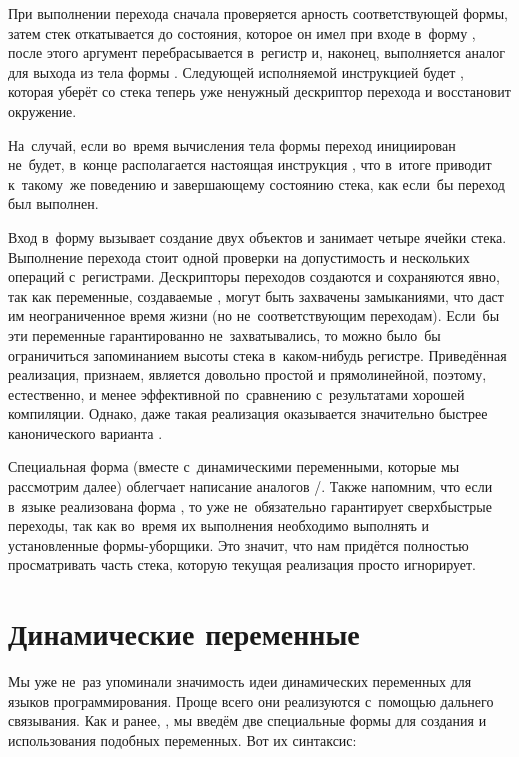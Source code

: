 При выполнении перехода сначала проверяется арность соответствующей формы,
затем стек откатывается до состояния, которое он имел при входе в~форму
, после этого аргумент перебрасывается в~регистр  и,
наконец, выполняется аналог  для выхода из тела формы .
Следующей исполняемой инструкцией будет , которая уберёт
со стека теперь уже ненужный дескриптор перехода и восстановит окружение.

На~случай, если во~время вычисления тела формы  переход
инициирован не~будет, в~конце располагается настоящая инструкция ,
что в~итоге приводит к~такому~же поведению и завершающему состоянию стека, как
если~бы переход был выполнен.

Вход в~форму  вызывает создание двух объектов и занимает четыре
ячейки стека. Выполнение перехода стоит одной проверки на допустимость и
нескольких операций с~регистрами. Дескрипторы переходов создаются и сохраняются
явно, так как переменные, создаваемые , могут быть захвачены
замыканиями, что даст им неограниченное время жизни (но не~соответствующим
переходам). Если~бы эти переменные гарантированно не~захватывались, то можно
было~бы ограничиться запоминанием высоты стека в~каком-нибудь регистре.
Приведённая реализация, признаем, является довольно простой и прямолинейной,
поэтому, естественно, и менее эффективной по~сравнению с~результатами хорошей
компиляции. Однако, даже такая реализация оказывается значительно быстрее
канонического варианта .

Специальная форма  (вместе с~динамическими переменными, которые
мы рассмотрим далее) облегчает написание аналогов \slash{}.
 Также напомним, что если в~языке
реализована форма , то  уже не~обязательно
гарантирует сверхбыстрые переходы, так как во~время их выполнения необходимо
выполнять и установленные  формы-уборщики. Это значит, что
нам придётся полностью просматривать часть стека, которую текущая реализация
просто игнорирует.


\section{Динамические переменные}\label{compilation/sect:dynamic}

Мы уже не~раз упоминали значимость идеи динамических переменных для языков
программирования. Проще всего они реализуются с~помощью дальнего связывания. Как
и ранее, , мы введём две специальные
формы для создания и использования подобных переменных. Вот их синтаксис:

